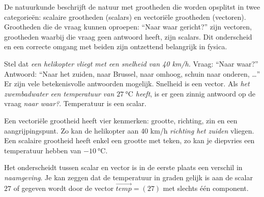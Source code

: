 \documentclass{ximera}
\begin{document}
	\author{Bart Lambregs}
    \xmsource\xmuitleg


De natuurkunde beschrijft de natuur met grootheden die worden opsplitst in twee categorieën: scalaire grootheden (scalars) en vectoriële grootheden (vectoren). 
Grootheden die de vraag kunnen oproepen: “Naar waar gericht?” zijn vectoren, grootheden waarbij die vraag geen antwoord heeft, zijn scalars. 
Dit onderscheid en een correcte omgang met beiden zijn ontzettend belangrijk in fysica.


Stel dat \textit{een helikopter vliegt met een snelheid van 40 km/h.} 
Vraag: “Naar waar?” Antwoord: “Naar het zuiden, naar Brussel, naar omhoog, schuin naar onderen, …” 
Er zijn vele betekenisvolle antwoorden mogelijk. 
Snelheid is een vector. 
Als \textit{het zwembadwater een temperatuur van  \(\SI{27}{\celsius}\) heeft}, is er geen zinnig antwoord op de vraag \textit{naar waar?}. 
Temperatuur is een scalar.

Een vectoriële grootheid heeft vier kenmerken: grootte, richting, zin en een aangrijpingspunt. 
Zo kan de helikopter aan 40 km/h \textit{richting het zuiden} vliegen. %
Een scalaire grootheid heeft enkel een grootte met teken, zo kan je diepvries een temperatuur hebben van \(\SI{-10}{\celsius}\).


\begin{remark}
Het onderscheidt tussen scalar en vector is in de eerste plaats een verschil in \textit{naamgeving}.
Je kan zeggen dat de temperatuur in graden gelijk is aan de scalar \(27\) of gegeven wordt door de vector \(\vec{temp} = (27) \) met slechts één component. 
\end{remark}




	
\end{document}
